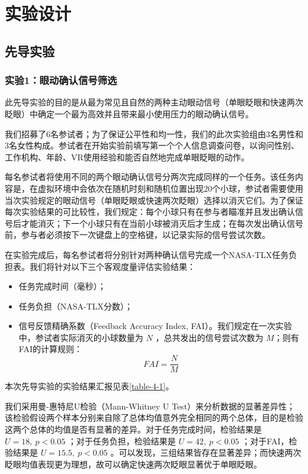 \chapter{实验设计}

\section{先导实验}

\subsection{实验1：眼动确认信号筛选}
\label{pilot-study-1}

此先导实验的目的是从最为常见且自然的两种主动眼动信号（单眼眨眼和快速两次眨眼）中确定一个最为高效并且带来最小使用压力的眼动确认信号。

我们招募了6名参试者；为了保证公平性和均一性，我们的此次实验组由3名男性和3名女性构成。参试者在开始实验前填写第一个个人信息调查问卷，以询问性别、工作机构、年龄、VR使用经验和能否自然地完成单眼眨眼的动作。

每名参试者将使用不同的两个眼动确认信号分两次完成同样的一个任务。该任务内容是，在虚拟环境中会依次在随机时刻和随机位置出现20个小球，参试者需要使用当次实验规定的眼动信号（单眼眨眼或快速两次眨眼）选择以消灭它们。为了保证每次实验结果的可比较性，我们规定：每个小球只有在参与者瞄准并且发出确认信号后才能消灭；下一个小球只有在当前小球被消灭后才生成；在每次发出确认信号前，参与者必须按下一次键盘上的空格键，以记录实际的信号尝试次数。

在实验完成后，每名参试者将分别针对两种确认信号完成一个NASA-TLX任务负担表。我们将针对以下三个客观度量评估实验结果：

\begin{itemize}[wide]
	\item 任务完成时间（毫秒）；
	\item 任务负担（NASA-TLX分数）；
	\item 信号反馈精确系数（Feedback Accuracy Index, FAI）。我们规定在一次实验中，参试者实际消灭的小球数量为 $N$ ，总共发出的信号尝试次数为 $M$；则有FAI的计算规则：
	\begin{equation}
	FAI = \frac{N}{M}
	\label{formula-4-1}
	\end{equation}
\end{itemize}

本次先导实验的实验结果汇报见表\ref{table-4-1}。

我们采用曼-惠特尼U检验（Mann-Whitney U Test）来分析数据的显著差异性；该检验假设两个样本分别来自除了总体均值意外完全相同的两个总体，目的是检验这两个总体的均值是否有显著的差异。对于任务完成时间，检验结果是 $U = 18,\ p < 0.05$ ；对于任务负担，检验结果是 $U = 42,\ p < 0.05$ ；对于FAI，检验结果是 $U = 15.5,\ p < 0.05$ 。可以发现，三组结果皆存在显著差异；而快速两次眨眼均值表现更为理想，故可以确定快速两次眨眼显著优于单眼眨眼。

